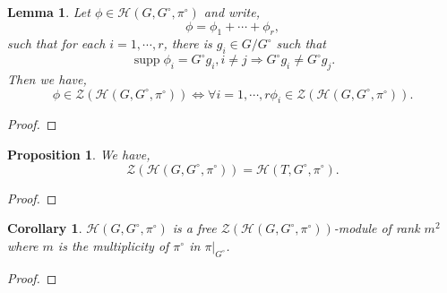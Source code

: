 \documentclass[8pt]{article}
\newtheorem{proposition}{Proposition}[section]
\newtheorem{lemma}{Lemma}[section]
\newtheorem{corollary}{Corollary} [section]
\DeclareMathOperator{\supp}{supp}
\newcommand{\hecke}[0]{\mathscr{H}}
\begin{document}
  \begin{lemma}
    \label{lemma_96}
    Let $\phi\in\hecke(G,G^\circ,\pi^\circ)$ and write,
    \begin{equation*}
      \phi = \phi_1+\cdots+\phi_r,
    \end{equation*}
    such that for each $i=1,\cdots,r$, there is $g_i\in G/G^\circ$ such that 
    \begin{equation*}
      \supp\phi_i = G^\circ g_i, i\not=j\Rightarrow G^\circ g_i\not=G^\circ g_j.
    \end{equation*}
    Then we have,
    \begin{equation*}
      \phi\in\mathscr{Z}(\hecke(G,G^\circ,\pi^\circ))\Leftrightarrow\forall i=1,\cdots,r\phi_i\in\mathscr{Z}(\hecke(G,G^\circ,\pi^\circ)).
    \end{equation*}
  \end{lemma}
  \begin{proof}
  \end{proof}

  \begin{proposition}
    \label{proposition_97}
    We have,
    \begin{equation*}
      \mathscr{Z}(\hecke(G,G^\circ,\pi^\circ)) = \hecke(T,G^\circ,\pi^\circ).
    \end{equation*}
  \end{proposition}

  \begin{proof}
  \end{proof}

  \begin{corollary}
    $\hecke(G,G^\circ,\pi^\circ)$ is a free $\mathscr{Z}(\hecke(G,G^\circ,\pi^\circ))$-module of rank $m^2$ where $m$ is the multiplicity of $\pi^\circ$ in $\pi|_{G^\circ}$.
    \label{corollary_98}
  \end{corollary}

    \begin{proof}
  \end{proof}
\end{document}
